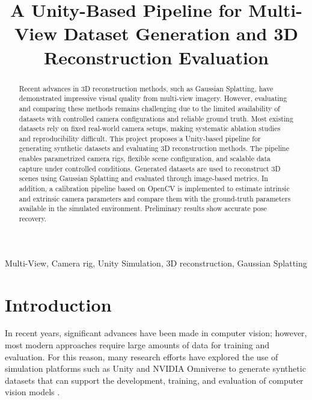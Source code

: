 \documentclass[conference]{IEEEtran}
\begin{document}
\title{A Unity-Based Pipeline for Multi-View Dataset Generation and 3D Reconstruction Evaluation\\}


\author{
}


\maketitle

\begin{abstract}
Recent advances in 3D reconstruction methods, such as Gaussian Splatting, have demonstrated impressive visual quality from multi-view imagery. However, evaluating and comparing these methods remains challenging due to the limited availability of datasets with controlled camera configurations and reliable ground truth. Most existing datasets rely on fixed real-world camera setups, making systematic ablation studies and reproducibility difficult.
This project proposes a Unity-based pipeline for generating synthetic datasets and evaluating 3D reconstruction methods. The pipeline enables parametrized camera rigs, flexible scene configuration,
and scalable data capture under controlled conditions. Generated datasets are used to reconstruct 3D scenes using Gaussian Splatting and evaluated through image-based metrics. In addition, a calibration pipeline based on OpenCV is implemented to estimate intrinsic and extrinsic camera parameters and compare them with the ground-truth parameters available in the simulated environment. Preliminary results show accurate pose recovery.
\end{abstract}

\begin{IEEEkeywords}
Multi-View, Camera rig, Unity Simulation, 3D reconstruction, Gaussian Splatting
\end{IEEEkeywords}

\section{Introduction}
In recent years, significant advances have been made in computer vision; however, most modern approaches require large amounts of data for training and evaluation. For this reason, many research efforts have explored the use of simulation platforms such as Unity and NVIDIA Omniverse to generate synthetic datasets that can support the development, training, and evaluation of computer vision models \cite{unitySynthetic,synthetic}.
\end{document}
